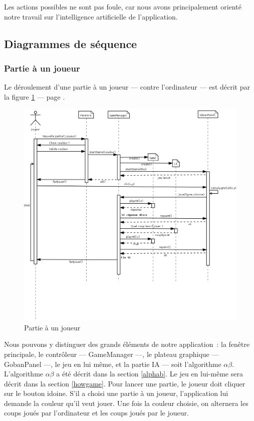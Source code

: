\documentclass[11pt,a4paper,titlepage,french]{article}
\begin{document}
		Les actions possibles ne sont pas foule, car nous avons principalement orienté notre travail sur l'intelligence artificielle de l'application.

		\subsection{Diagrammes de séquence}

			\subsubsection{Partie à un joueur}
				Le déroulement d'une partie à un joueur --- contre l'ordinateur --- est décrit par la figure \ref{oneplayer} --- page \pageref{oneplayer}.

				\begin{figure}[ohbt]
					\begin{center}
						\includegraphics[width=1.1\textwidth]{./IA_1J.png}
					\end{center}
					\caption{Partie à un joueur}
					\label{oneplayer}
				\end{figure}


				Nous pouvons y distinguer des grands éléments de notre application~: la fenêtre principale, le contrôleur --- GameManager ---, le plateau graphique --- GobanPanel ---, le jeu en lui même, et la partie IA --- soit l'algorithme $\alpha\beta$. L'algorithme $\alpha\beta$ a été décrit dans la section \ref{alphab}. Le jeu en lui-même sera décrit dans la section \ref{howgame}. Pour lancer une partie, le joueur doit cliquer sur le bouton idoine. S'il a choisi une partie à un joueur, l'application lui demande la couleur qu'il veut jouer. Une fois la couleur choisie, on alternera les coups joués par l'ordinateur et les coups joués par le joueur.
\end{document}
